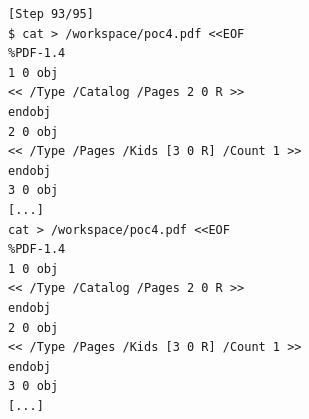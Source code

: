 \begin{tcolorbox}[enhanced,title={Example of long plaintext}]




\begin{verbatim}
[Step 93/95]
$ cat > /workspace/poc4.pdf <<EOF
%PDF-1.4
1 0 obj
<< /Type /Catalog /Pages 2 0 R >>
endobj
2 0 obj
<< /Type /Pages /Kids [3 0 R] /Count 1 >>
endobj
3 0 obj
[...]
cat > /workspace/poc4.pdf <<EOF
%PDF-1.4
1 0 obj
<< /Type /Catalog /Pages 2 0 R >>
endobj
2 0 obj
<< /Type /Pages /Kids [3 0 R] /Count 1 >>
endobj
3 0 obj
[...]
\end{verbatim}


\end{tcolorbox}
